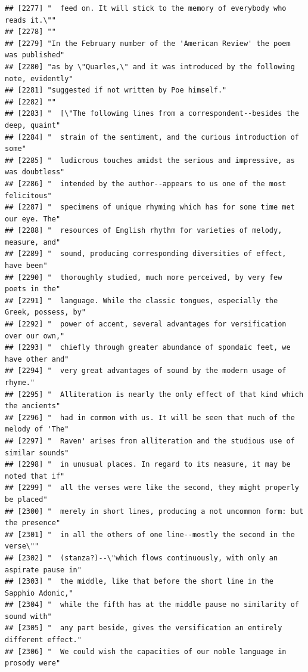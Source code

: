 \documentclass{article}\usepackage[]{graphicx}\usepackage[]{color}
\makeatletter
\newenvironment{kframe}{%
 \def\at@end@of@kframe{}%
 \ifinner\ifhmode%
  \def\at@end@of@kframe{\end{minipage}}%
  \begin{minipage}{\columnwidth}%
 \fi\fi%
 \def\FrameCommand##1{\hskip\@totalleftmargin \hskip-\fboxsep
 \colorbox{shadecolor}{##1}\hskip-\fboxsep
     \hskip-\linewidth \hskip-\@totalleftmargin \hskip\columnwidth}%
 \MakeFramed {\advance\hsize-\width
   \@totalleftmargin\z@ \linewidth\hsize
   \@setminipage}}%
 {\par\unskip\endMakeFramed%
 \at@end@of@kframe}
\newenvironment{knitrout}{}{} %
\makeatother
\begin{document}
\begin{knitrout}
\begin{kframe}
\begin{verbatim}
## [2277] "  feed on. It will stick to the memory of everybody who reads it.\""         
## [2278] ""                                                                            
## [2279] "In the February number of the 'American Review' the poem was published"      
## [2280] "as by \"Quarles,\" and it was introduced by the following note, evidently"   
## [2281] "suggested if not written by Poe himself."                                    
## [2282] ""                                                                            
## [2283] "  [\"The following lines from a correspondent--besides the deep, quaint"     
## [2284] "  strain of the sentiment, and the curious introduction of some"             
## [2285] "  ludicrous touches amidst the serious and impressive, as was doubtless"     
## [2286] "  intended by the author--appears to us one of the most felicitous"          
## [2287] "  specimens of unique rhyming which has for some time met our eye. The"      
## [2288] "  resources of English rhythm for varieties of melody, measure, and"         
## [2289] "  sound, producing corresponding diversities of effect, have been"           
## [2290] "  thoroughly studied, much more perceived, by very few poets in the"         
## [2291] "  language. While the classic tongues, especially the Greek, possess, by"    
## [2292] "  power of accent, several advantages for versification over our own,"       
## [2293] "  chiefly through greater abundance of spondaic feet, we have other and"     
## [2294] "  very great advantages of sound by the modern usage of rhyme."              
## [2295] "  Alliteration is nearly the only effect of that kind which the ancients"    
## [2296] "  had in common with us. It will be seen that much of the melody of 'The"    
## [2297] "  Raven' arises from alliteration and the studious use of similar sounds"    
## [2298] "  in unusual places. In regard to its measure, it may be noted that if"      
## [2299] "  all the verses were like the second, they might properly be placed"        
## [2300] "  merely in short lines, producing a not uncommon form: but the presence"    
## [2301] "  in all the others of one line--mostly the second in the verse\""           
## [2302] "  (stanza?)--\"which flows continuously, with only an aspirate pause in"     
## [2303] "  the middle, like that before the short line in the Sapphio Adonic,"        
## [2304] "  while the fifth has at the middle pause no similarity of sound with"       
## [2305] "  any part beside, gives the versification an entirely different effect."    
## [2306] "  We could wish the capacities of our noble language in prosody were"        

\end{verbatim}
\end{kframe}
\end{knitrout}
\end{document}
